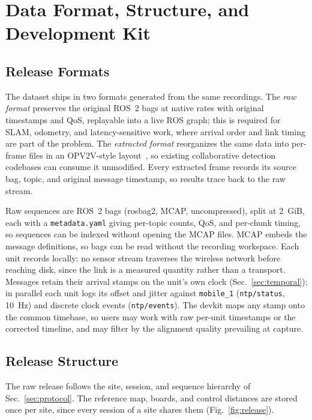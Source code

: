 \documentclass[conference]{IEEEtran}
\begin{document}




\section{Data Format, Structure, and Development Kit}
\label{sec:format}

\subsection{Release Formats}
The dataset ships in two formats generated from the same recordings.
The \emph{raw format} preserves the original ROS~2 bags at native
rates with original timestamps and QoS, replayable into a live ROS
graph; this is required for SLAM, odometry, and latency-sensitive
work, where arrival order and link timing are part of the problem. The
\emph{extracted format} reorganizes the same data into per-frame files
in an OPV2V-style layout~\cite{opv2v}, so existing collaborative
detection codebases can consume it unmodified. Every extracted frame
records its source bag, topic, and original message timestamp, so
results trace back to the raw stream.

Raw sequences are ROS~2 bags (rosbag2, MCAP, uncompressed), split at
\SI{2}{GiB}, each with a \texttt{metadata.yaml} giving per-topic
counts, QoS, and per-chunk timing, so sequences can be indexed without
opening the MCAP files. MCAP embeds the message definitions, so bags
can be read without the recording workspace. Each unit records
locally: no sensor stream traverses the wireless network before
reaching disk, since the link is a measured quantity rather than a
transport. Messages retain their arrival stamps on the unit's own
clock (Sec.~\ref{sec:temporal}); in parallel each unit logs its offset
and jitter against \texttt{mobile\_1} (\texttt{ntp/status},
\SI{10}{\hertz}) and discrete clock events (\texttt{ntp/events}). The
devkit maps any stamp onto the common timebase, so users may work with
raw per-unit timestamps or the corrected timeline, and may filter by
the alignment quality prevailing at capture.

\subsection{Release Structure}
The raw release follows the site, session, and sequence hierarchy of
Sec.~\ref{sec:protocol}. The reference map, boards, and control
distances are stored once per site, since every session of a site
shares them (Fig.~\ref{fig:release}).
\end{document}
